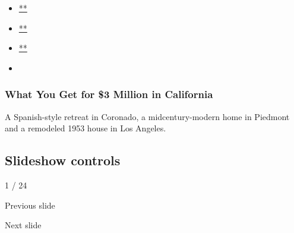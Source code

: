 \begin{itemize}
\item
  \href{https://www.facebook.com/sharer.php?app_id=9869919170\&u=https\%3A\%2F\%2Fwww.nytimes.com\%2Fslideshow\%2F2020\%2F08\%2F03\%2Frealestate\%2Fwhat-you-get-for-3-million-in-california.html\%3Fsmid\%3Dfb-share\&name=What\%20You\%20Get\%20for\%20\%243\%20Million\%20in\%20California\&redirect_uri=https\%3A\%2F\%2Fwww.facebook.com\%2F}{**}
\item
  \href{https://twitter.com/intent/tweet?url=https\%3A\%2F\%2Fwww.nytimes.com\%2Fslideshow\%2F2020\%2F08\%2F03\%2Frealestate\%2Fwhat-you-get-for-3-million-in-california.html\%3Fsmid\%3Dtw-share\&text=What\%20You\%20Get\%20for\%20\%243\%20Million\%20in\%20California}{**}
\item
  \href{mailto:?subject=NYTimes.com\%3A\%20What\%20You\%20Get\%20for\%20\%243\%20Million\%20in\%20California\&body=From\%20The\%20New\%20York\%20Times\%3A\%0A\%0AWhat\%20You\%20Get\%20for\%20\%243\%20Million\%20in\%20California\%0A\%0AA\%20Spanish-style\%20retreat\%20in\%20Coronado\%2C\%20a\%20midcentury-modern\%20home\%20in\%20Piedmont\%20and\%20a\%20remodeled\%201953\%20house\%20in\%20Los\%20Angeles.\%0A\%0Ahttps\%3A\%2F\%2Fwww.nytimes.com\%2Fslideshow\%2F2020\%2F08\%2F03\%2Frealestate\%2Fwhat-you-get-for-3-million-in-california.html\%3Fsmid\%3Dem-share}{**}
\item
\end{itemize}

\hypertarget{what-you-get-for-3-million-in-california-1}{%
\subsubsection{What You Get for \$3 Million in
California}\label{what-you-get-for-3-million-in-california-1}}

A Spanish-style retreat in Coronado, a midcentury-modern home in
Piedmont and a remodeled 1953 house in Los Angeles.

\hypertarget{slideshow-controls}{%
\subsection{Slideshow controls}\label{slideshow-controls}}

1 / 24

Previous slide

Next slide
